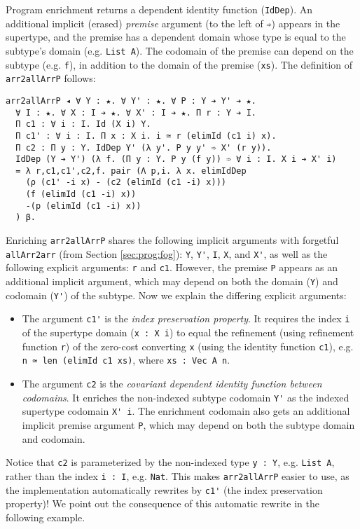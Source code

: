 \documentclass[acmsmall]{acmart}\settopmatter{}
\newcommand{\refsec}[1]{Section \ref{sec:#1}}
\begin{document}
Program enrichment returns a dependent identity function
(\verb;IdDep;). 
An additional implicit (erased) \textit{premise} argument
(to the left of \verb;➾;)
appears in the supertype, and the premise has a dependent domain
whose type is equal to the subtype's domain (e.g. \verb;List A;).
The codomain of the premise can depend on the subtype (e.g. \verb;f;),
in addition to the domain of the premise (\verb;xs;).
The definition of \verb;arr2allArrP; follows:

\begin{verbatim}
arr2allArrP ◂ ∀ Y : ★. ∀ Y' : ★. ∀ P : Y ➔ Y' ➔ ★.
  ∀ I : ★. ∀ X : I ➔ ★. ∀ X' : I ➔ ★. Π r : Y ➔ I.
  Π c1 : ∀ i : I. Id (X i) Y.
  Π c1' : ∀ i : I. Π x : X i. i ≃ r (elimId (c1 i) x).
  Π c2 : Π y : Y. IdDep Y' (λ y'. P y y' ➾ X' (r y)).
  IdDep (Y ➔ Y') (λ f. (Π y : Y. P y (f y)) ➾ ∀ i : I. X i ➔ X' i)
  = λ r,c1,c1',c2,f. pair (Λ p,i. λ x. elimIdDep
    (ρ (c1' -i x) - (c2 (elimId (c1 -i) x)))
    (f (elimId (c1 -i) x))
    -(p (elimId (c1 -i) x))
  ) β.
\end{verbatim}
Enriching \verb;arr2allArrP; shares the following implicit arguments
with forgetful \verb;allArr2arr; (from \refsec{prog:fog}):
\verb;Y;, \verb;Y';, \verb;I;, \verb;X;, and \verb;X';, as well as the
following explicit arguments: \verb;r; and \verb|c1|.
However, the premise \verb;P; appears as an additional implicit
argument, which may depend on both the domain (\verb;Y;) and codomain
(\verb;Y';) of the subtype. Now we explain the differing explicit
arguments:
\begin{itemize}
\item The argument \verb;c1'; is the
  \textit{index preservation property}.
  It requires the index \verb;i; of the supertype domain
  (\verb;x : X i;) to equal the refinement (using refinement
  function \verb;r;) of the zero-cost converting \verb;x;
  (using the identity function \verb;c1;),
  e.g. \verb;n ≃ len (elimId c1 xs);, where
  \verb;xs : Vec A n;.

\item The argument \verb;c2; is the
  \textit{covariant dependent identity function between codomains}.
  It enriches the non-indexed subtype codomain \verb;Y';
  as the indexed supertype codomain \verb;X' i;.
  The enrichment codomain also gets an additional implicit premise
  argument \verb;P;, which may depend on both the subtype domain and
  codomain.
\end{itemize}

Notice that \verb;c2; is parameterized by the non-indexed
type \verb;y : Y;,
e.g. \verb;List A;, rather than the index \verb;i : I;,
e.g. \verb;Nat;. This makes \verb;arr2allArrP; easier to use, as the
implementation automatically rewrites by \verb;c1'; (the index
preservation property)! We point out the consequence of this automatic
rewrite in the following example.
\end{document}
